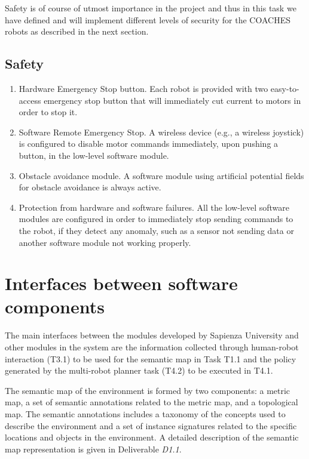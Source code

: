 \documentclass{article}
\begin{document}
Safety is of course of utmost importance in the project and thus in this task we have defined and will implement different levels of security for the COACHES robots as described in the next section.


\subsection{Safety}


\begin{enumerate}
\item Hardware Emergency Stop button. Each robot is provided with two easy-to-access emergency stop button that will immediately cut current to motors in order to stop it.
\item Software Remote Emergency Stop. A wireless device (e.g., a wireless joystick) is configured to disable motor commands immediately, upon pushing a button, in the low-level software module.
\item Obstacle avoidance module. A software module using artificial potential fields for obstacle avoidance is always active.
\item Protection from hardware and software failures. All the low-level software modules are configured in order to immediately stop sending commands to the robot, if they detect any anomaly, such as a sensor not sending data or another software module not working properly. 
\end{enumerate}


\section{Interfaces between software components}

The main interfaces between the modules developed by Sapienza University and other modules in the system are the information collected through human-robot interaction (T3.1) to be used for the semantic map in Task T1.1 and the policy generated by the multi-robot planner task (T4.2) to be executed in T4.1.

The semantic map of the environment is formed by two components: a metric map, a set of semantic annotations related to the metric map, and a topological map. The semantic annotations includes a taxonomy of the concepts used to describe the environment and a set of instance signatures related to the specific locations and objects in the environment.
A detailed description of the semantic map representation is given in Deliverable \emph{D1.1}.
\end{document}
